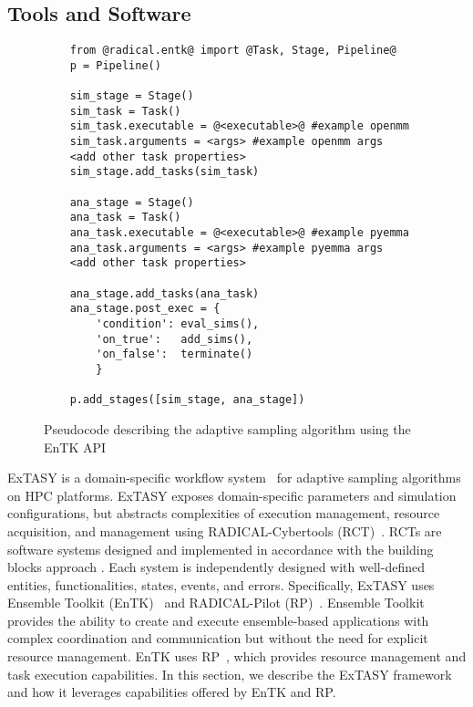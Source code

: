 \subsection{\label{sec:Tools}Tools and Software}
\begin{figure}[h!]
    \begin{lstlisting}
    from @radical.entk@ import @Task, Stage, Pipeline@
    p = Pipeline()

    sim_stage = Stage()   
    sim_task = Task()
    sim_task.executable = @<executable>@ #example openmm
    sim_task.arguments = <args> #example openmm args
    <add other task properties>
    sim_stage.add_tasks(sim_task)
    
    ana_stage = Stage()
    ana_task = Task()
    ana_task.executable = @<executable>@ #example pyemma
    ana_task.arguments = <args> #example pyemma args
    <add other task properties>
    
    ana_stage.add_tasks(ana_task)
    ana_stage.post_exec = {
        'condition': eval_sims(),
        'on_true':   add_sims(),
        'on_false':  terminate()
        }
    
    p.add_stages([sim_stage, ana_stage])
    \end{lstlisting}
    \caption{Pseudocode describing the adaptive sampling algorithm using the
    EnTK API}\label{extasy_snippet}
\end{figure}


ExTASY is a domain-specific workflow
system~\cite{turilli2019middleware,turilli2018building} for adaptive sampling
algorithms on HPC platforms. ExTASY exposes domain-specific parameters and
simulation configurations, but abstracts complexities of execution management,
resource acquisition, and management using RADICAL-Cybertools
(RCT)~\cite{Balasubramanian2019rct}. RCTs are software systems designed and
implemented in accordance with the building blocks approach
\cite{turilli2018building}. Each system is independently designed with
well-defined entities, functionalities, states, events, and errors.
Specifically, ExTASY uses Ensemble Toolkit
(EnTK)~\cite{balasubramanian2018harnessing} and RADICAL-Pilot
(RP)~\cite{merzky2018using}. Ensemble
Toolkit~\cite{entk-icpp-2016,balasubramanian2018harnessing} provides the
ability to create and execute ensemble-based applications with complex
coordination and communication but without the need for explicit resource
management.  EnTK uses RP~\cite{merzky2018using}, which provides resource
management and task execution capabilities. In this section, we describe the
ExTASY framework and how it leverages capabilities offered by EnTK and RP.



